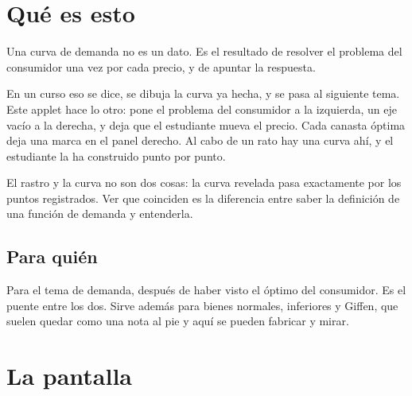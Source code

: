 \documentclass[11pt,a4paper]{appletmanual}
\begin{document}

\manualtoc
\thispagestyle{empty}
\clearpage
\setcounter{page}{1}

\section{Qué es esto}

Una curva de demanda no es un dato. Es el resultado de resolver el problema del
consumidor una vez por cada precio, y de apuntar la respuesta.

En un curso eso se dice, se dibuja la curva ya hecha, y se pasa al siguiente
tema. Este applet hace lo otro: pone el problema del consumidor a la izquierda,
un eje vacío a la derecha, y deja que el estudiante mueva el precio. Cada
canasta óptima deja una marca en el panel derecho. Al cabo de un rato hay una
curva ahí, y el estudiante la ha construido punto por punto.


\begin{amkey}
El rastro y la curva no son dos cosas: la curva revelada pasa exactamente por
los puntos registrados. Ver que coinciden es la diferencia entre saber la
definición de una función de demanda y entenderla.
\end{amkey}

\subsection{Para quién}

Para el tema de demanda, después de haber visto el óptimo del consumidor. Es el
puente entre los dos. Sirve además para bienes normales, inferiores y Giffen,
que suelen quedar como una nota al pie y aquí se pueden fabricar y mirar.



\section{La pantalla}
\end{document}
